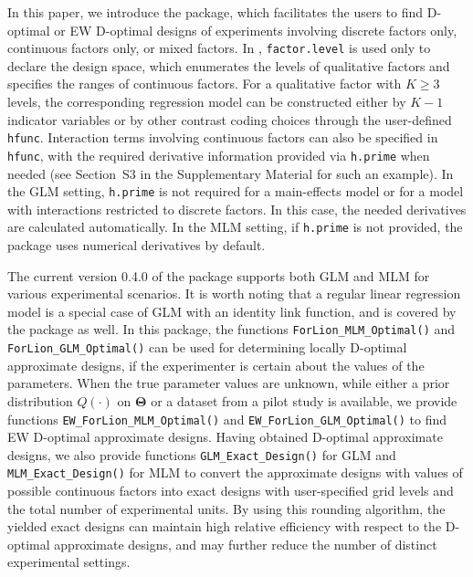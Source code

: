 In this paper, we introduce the  package, which facilitates the users to find D-optimal or EW D-optimal designs of experiments involving discrete factors only,  continuous factors only, or mixed factors. In , \texttt{factor.level} is used only to declare the design space, which enumerates the levels of qualitative factors and specifies the ranges of continuous factors. For a qualitative factor with $K \ge 3$ levels, the corresponding regression model can be constructed either by $K-1$ indicator variables or by other contrast coding choices through the user-defined \texttt{hfunc}. Interaction terms involving continuous factors can also be specified in \texttt{hfunc}, with the required derivative information provided via \texttt{h.prime} when needed (see Section~S3 in the Supplementary Material for such an example). In the GLM setting, \texttt{h.prime} is not required for a main-effects model or for a model with interactions restricted to discrete factors. In this case, the needed derivatives are calculated automatically. In the MLM setting, if \texttt{h.prime} is not provided, the package uses numerical derivatives by default.

The current version 0.4.0 of the  package supports both GLM and MLM for various experimental scenarios. It is worth noting that a regular linear regression model is a special case of GLM with an identity link function, and is covered by the  package as well. In this package, the functions \texttt{ForLion\_MLM\_Optimal()} and \texttt{ForLion\_GLM\_Optimal()} can be used for determining locally D-optimal approximate designs, if the experimenter is certain about the values of the parameters. When the true parameter values are unknown, while either a prior distribution $Q(\cdot)$ on $\boldsymbol{\Theta}$ or a dataset from a pilot study is available, we provide functions \texttt{EW\_ForLion\_MLM\_Optimal()} and \texttt{EW\_ForLion\_GLM\_Optimal()} to find EW D-optimal approximate designs. 
Having obtained D-optimal approximate designs, we also provide functions \texttt{GLM\_Exact\_Design()} for GLM and \texttt{MLM\_Exact\_Design()} for MLM to convert the approximate designs with values of possible continuous factors into exact designs with user-specified grid levels and the total number of experimental units.
By using this rounding algorithm, the yielded exact designs can maintain high relative efficiency with respect to the D-optimal approximate designs, and may further reduce the number of distinct experimental settings.

